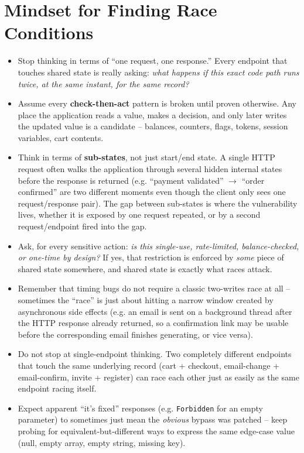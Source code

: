 \documentclass[11pt]{article}
\begin{document}
\section{Mindset for Finding Race Conditions}
\begin{itemize}[leftmargin=1.2em]
  \item Stop thinking in terms of ``one request, one response.'' Every endpoint that touches shared state is really asking: \textit{what happens if this exact code path runs twice, at the same instant, for the same record?}
  \item Assume every \textbf{check-then-act} pattern is broken until proven otherwise. Any place the application reads a value, makes a decision, and only later writes the updated value is a candidate -- balances, counters, flags, tokens, session variables, cart contents.
  \item Think in terms of \textbf{sub-states}, not just start/end state. A single HTTP request often walks the application through several hidden internal states before the response is returned (e.g. ``payment validated'' $\rightarrow$ ``order confirmed'' are two different moments even though the client only sees one request/response pair). The gap between sub-states is where the vulnerability lives, whether it is exposed by one request repeated, or by a second request/endpoint fired into the gap.
  \item Ask, for every sensitive action: \textit{is this single-use, rate-limited, balance-checked, or one-time by design?} If yes, that restriction is enforced by \emph{some} piece of shared state somewhere, and shared state is exactly what races attack.
  \item Remember that timing bugs do not require a classic two-writes race at all -- sometimes the ``race'' is just about hitting a narrow window created by asynchronous side effects (e.g. an email is sent on a background thread after the HTTP response already returned, so a confirmation link may be usable before the corresponding email finishes generating, or vice versa).
  \item Do not stop at single-endpoint thinking. Two completely different endpoints that touch the same underlying record (cart + checkout, email-change + email-confirm, invite + register) can race each other just as easily as the same endpoint racing itself.
  \item Expect apparent ``it's fixed'' responses (e.g. \texttt{Forbidden} for an empty parameter) to sometimes just mean the \emph{obvious} bypass was patched -- keep probing for equivalent-but-different ways to express the same edge-case value (null, empty array, empty string, missing key).
\end{itemize}
 
\end{document}
